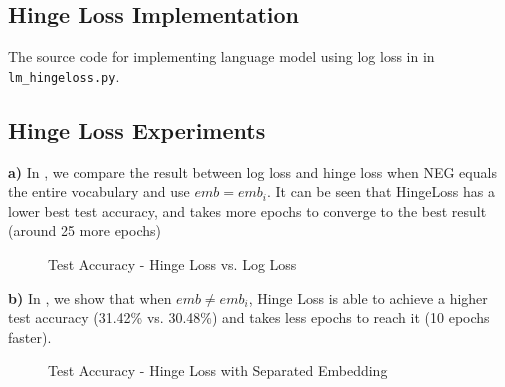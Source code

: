 \documentclass{article}
\begin{document}
\subsection{Hinge Loss Implementation}
The source code for implementing language model using log loss in in \texttt{lm\_hingeloss.py}. 

\subsection{Hinge Loss Experiments}

\textbf{a)}
In , we compare the result between log loss and hinge loss when NEG equals the entire vocabulary and use $emb = emb_i$. It can be seen that HingeLoss has a lower best test accuracy, and takes more epochs to converge to the best result (around 25 more epochs)

\begin{figure}
\centering
{}
\caption{Test Accuracy - Hinge Loss vs. Log Loss}
\label{fig:hinge_log}
\end{figure}

\textbf{b)}
In , we show that when $emb \neq emb_i$, Hinge Loss is able to achieve a higher test accuracy (31.42\% vs. 30.48\%) and takes less epochs to reach it (10 epochs faster).

\begin{figure}
\centering
{}
\caption{Test Accuracy - Hinge Loss with Separated Embedding}
\label{fig:hinge_2}
\end{figure}
\end{document}
